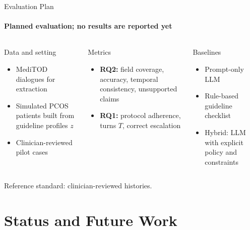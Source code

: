 \documentclass[
aspectratio=169,	%
english,			%
]{DEEclassP}
\begin{document}
\begin{frame}{Evaluation Plan}
\framesubtitle{Planned evaluation; no results are reported yet}

\vspace{0.2cm}
\begin{columns}[T]
\begin{block}{Data and setting}
\small
\begin{itemize}
	\item MediTOD dialogues for extraction
	\item Simulated PCOS patients built from guideline profiles $z$
	\item Clinician-reviewed pilot cases
\end{itemize}
\end{block}
\begin{block}{Metrics}
\small
\begin{itemize}
	\item \textbf{RQ2:} field coverage, accuracy, temporal consistency, unsupported claims
	\item \textbf{RQ1:} protocol adherence, turns $T$, correct escalation
\end{itemize}
\end{block}
\begin{block}{Baselines}
\small
\begin{itemize}
	\item Prompt-only LLM
	\item Rule-based guideline checklist
	\item Hybrid: LLM with explicit policy and constraints
\end{itemize}
\end{block}
\end{columns}

\vspace{0.4cm}
\begin{center}
\small Reference standard: clinician-reviewed histories.
\end{center}

\end{frame}

\section{Status and Future Work}
\end{document}
